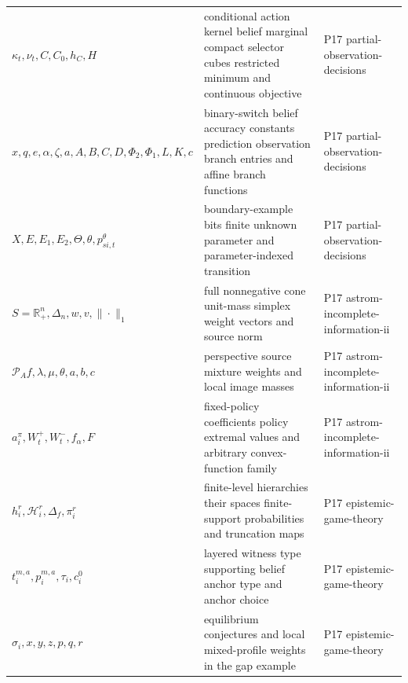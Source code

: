 \begin{longtable}{@{}p{}p{}p{}@{}}
\(\kappa_t,\allowbreak \nu_t,\allowbreak C,\allowbreak C_0,\allowbreak h_C,\allowbreak H\) & conditional action kernel belief marginal compact selector cubes restricted minimum and continuous objective & P17 partial-\allowbreak{}observation-\allowbreak{}decisions \\
\(x,\allowbreak q,\allowbreak e,\allowbreak \alpha,\allowbreak \zeta,\allowbreak a,\allowbreak A,\allowbreak B,\allowbreak C,\allowbreak D,\allowbreak \Phi_2,\allowbreak \Phi_1,\allowbreak L,\allowbreak K,\allowbreak c\) & binary-switch belief accuracy constants prediction observation branch entries and affine branch functions & P17 partial-\allowbreak{}observation-\allowbreak{}decisions \\
\(X,\allowbreak E,\allowbreak E_1,\allowbreak E_2,\allowbreak \Theta,\allowbreak \theta,\allowbreak p_{si,t}^{\theta}\) & boundary-example bits finite unknown parameter and parameter-indexed transition & P17 partial-\allowbreak{}observation-\allowbreak{}decisions \\
\(S=\mathbb R_+^n,\allowbreak \Delta_n,\allowbreak w,\allowbreak v,\allowbreak \|\cdot\|_1\) & full nonnegative cone unit-mass simplex weight vectors and source norm & P17 astrom-\allowbreak{}incomplete-\allowbreak{}information-\allowbreak{}ii \\
\(\mathcal P_A f,\allowbreak \lambda,\allowbreak \mu,\allowbreak \theta,\allowbreak a,\allowbreak b,\allowbreak c\) & perspective source mixture weights and local image masses & P17 astrom-\allowbreak{}incomplete-\allowbreak{}information-\allowbreak{}ii \\
\(a_i^\pi,\allowbreak W_t^+,\allowbreak W_t^-,\allowbreak f_\alpha,\allowbreak F\) & fixed-policy coefficients policy extremal values and arbitrary convex-function family & P17 astrom-\allowbreak{}incomplete-\allowbreak{}information-\allowbreak{}ii \\
\(h_i^r,\allowbreak \mathcal H_i^r,\allowbreak \Delta_f,\allowbreak \pi_i^r\) & finite-level hierarchies their spaces finite-support probabilities and truncation maps & P17 epistemic-\allowbreak{}game-\allowbreak{}theory \\
\(t_i^{m,a},\allowbreak p_i^{m,a},\allowbreak \tau_i,\allowbreak c_i^0\) & layered witness type supporting belief anchor type and anchor choice & P17 epistemic-\allowbreak{}game-\allowbreak{}theory \\
\(\sigma_i,\allowbreak x,\allowbreak y,\allowbreak z,\allowbreak p,\allowbreak q,\allowbreak r\) & equilibrium conjectures and local mixed-profile weights in the gap example & P17 epistemic-\allowbreak{}game-\allowbreak{}theory \\

\end{longtable}
